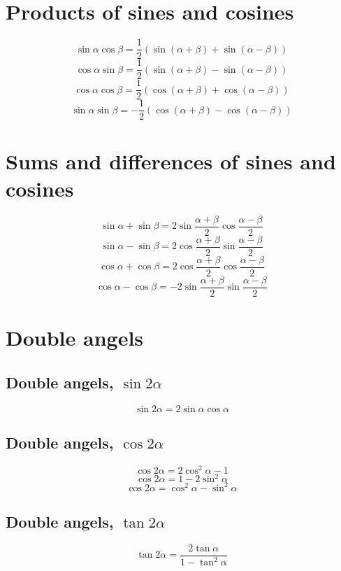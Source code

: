 \documentclass[a4paper, 10pt]{scrartcl}
\begin{document}
\section{Products of sines and cosines}
\[\sin{\alpha}\cos{\beta} = \frac{1}{2}(\sin{(\alpha + \beta)} + \sin{(\alpha - \beta)})\]
\[\cos{\alpha}\sin{\beta} = \frac{1}{2}(\sin{(\alpha + \beta)} - \sin{(\alpha - \beta)})\]
\[\cos{\alpha}\cos{\beta} = \frac{1}{2}(\cos{(\alpha + \beta)} + \cos{(\alpha - \beta)})\]
\[\sin{\alpha}\sin{\beta} = -\frac{1}{2}(\cos{(\alpha + \beta)} - \cos{(\alpha - \beta)})\]

\section{Sums and differences of sines and cosines}
\[\sin{\alpha} + \sin{\beta} = 2\sin{\frac{\alpha + \beta}{2}}\cos{\frac{\alpha - \beta}{2}}\]
\[\sin{\alpha} - \sin{\beta} = 2\cos{\frac{\alpha + \beta}{2}}\sin{\frac{\alpha - \beta}{2}}\]
\[\cos{\alpha} + \cos{\beta} = 2\cos{\frac{\alpha + \beta}{2}}\cos{\frac{\alpha - \beta}{2}}\]
\[\cos{\alpha} - \cos{\beta} = -2\sin{\frac{\alpha + \beta}{2}}\sin{\frac{\alpha - \beta}{2}}\]

\section{Double angels}

\subsection{Double angels, $\sin{2\alpha}$}
\[\sin{2\alpha} = 2\sin{\alpha}\cos{\alpha}\]

\subsection{Double angels, $\cos{2\alpha}$}
\[\cos{2\alpha} = 2\cos^{2}{\alpha} - 1\]
\[\cos{2\alpha} = 1 - 2\sin^{2}{\alpha}\]
\[\cos{2\alpha} = \cos^{2}{\alpha} - \sin^{2}{\alpha}\]

\subsection{Double angels, $\tan{2\alpha}$}
\[\tan{2\alpha} = \frac{2\tan{\alpha}}{1 - \tan^{2}{\alpha}}\]
\end{document}
